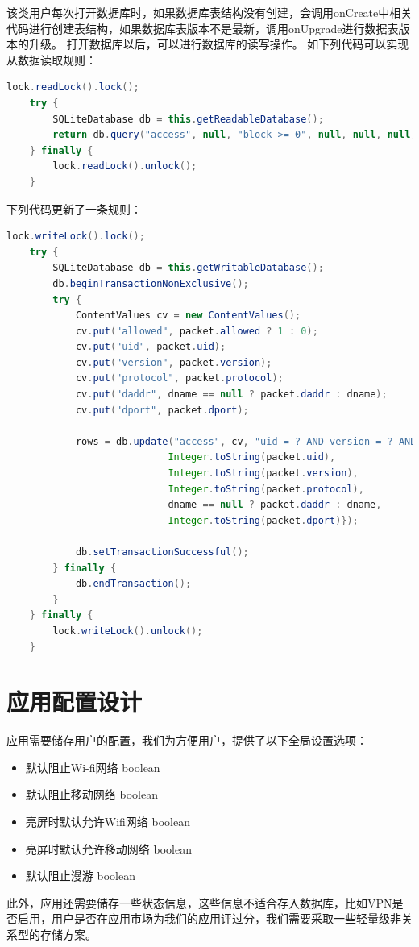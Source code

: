 \documentclass[format=final, language=chinese, degree=bachelor]{hustthesis}
\begin{document}
   该类用户每次打开数据库时，如果数据库表结构没有创建，会调用onCreate中相关代码进行创建表结构，如果数据库表版本不是最新，调用onUpgrade进行数据表版本的升级。
   打开数据库以后，可以进行数据库的读写操作。
   如下列代码可以实现从数据读取规则：

\begin{lstlisting}[language=java]
    lock.readLock().lock();
    try {
        SQLiteDatabase db = this.getReadableDatabase();
        return db.query("access", null, "block >= 0", null, null, null, "uid");
    } finally {
        lock.readLock().unlock();
    }
\end{lstlisting}

   下列代码更新了一条规则：

\begin{lstlisting}[language=java]
    lock.writeLock().lock();
    try {
        SQLiteDatabase db = this.getWritableDatabase();
        db.beginTransactionNonExclusive();
        try {
            ContentValues cv = new ContentValues();
            cv.put("allowed", packet.allowed ? 1 : 0);
            cv.put("uid", packet.uid);
            cv.put("version", packet.version);
            cv.put("protocol", packet.protocol);
            cv.put("daddr", dname == null ? packet.daddr : dname);
            cv.put("dport", packet.dport);

            rows = db.update("access", cv, "uid = ? AND version = ? AND protocol = ? AND daddr = ? AND dport = ?", new String[]{
                            Integer.toString(packet.uid),
                            Integer.toString(packet.version),
                            Integer.toString(packet.protocol),
                            dname == null ? packet.daddr : dname,
                            Integer.toString(packet.dport)});

            db.setTransactionSuccessful();
        } finally {
            db.endTransaction();
        }
    } finally {
        lock.writeLock().unlock();
    }
\end{lstlisting}


\section{应用配置设计}

应用需要储存用户的配置，我们为方便用户，提供了以下全局设置选项：
\begin{itemize}
	\item 默认阻止Wi-fi网络        boolean
	\item 默认阻止移动网络          boolean
	\item 亮屏时默认允许Wifi网络     boolean
	\item 亮屏时默认允许移动网络      boolean
	\item 默认阻止漫游              boolean
\end{itemize}
此外，应用还需要储存一些状态信息，这些信息不适合存入数据库，比如VPN是否启用，用户是否在应用市场为我们的应用评过分，我们需要采取一些轻量级非关系型的存储方案。
\end{document}
